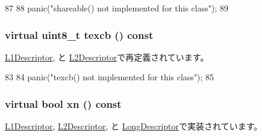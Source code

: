 \begin{DoxyCode}
87         {
88             panic("shareable() not implemented for this class\n");
89         }
\end{DoxyCode}
\hypertarget{classArmISA_1_1TableWalker_1_1DescriptorBase_a7d7e1ce90155279aa511dc49c2b887c2}{
\subsubsection[{texcb}]{\setlength{\rightskip}{0pt plus 5cm}virtual uint8\_\-t texcb () const}}
\label{classArmISA_1_1TableWalker_1_1DescriptorBase_a7d7e1ce90155279aa511dc49c2b887c2}


\hyperlink{classArmISA_1_1TableWalker_1_1L1Descriptor_a2f3e1adbe4ca1fa91c6c12f35828dd73}{L1Descriptor}, と \hyperlink{classArmISA_1_1TableWalker_1_1L2Descriptor_a2f3e1adbe4ca1fa91c6c12f35828dd73}{L2Descriptor}で再定義されています。


\begin{DoxyCode}
83         {
84             panic("texcb() not implemented for this class\n");
85         }
\end{DoxyCode}
\hypertarget{classArmISA_1_1TableWalker_1_1DescriptorBase_a92c5947cbc7259f6e536de82f5b33e4f}{
\subsubsection[{xn}]{\setlength{\rightskip}{0pt plus 5cm}virtual bool xn () const}}
\label{classArmISA_1_1TableWalker_1_1DescriptorBase_a92c5947cbc7259f6e536de82f5b33e4f}


\hyperlink{classArmISA_1_1TableWalker_1_1L1Descriptor_a88a5985b2a6224e7b546fa088b101d66}{L1Descriptor}, \hyperlink{classArmISA_1_1TableWalker_1_1L2Descriptor_a88a5985b2a6224e7b546fa088b101d66}{L2Descriptor}, と \hyperlink{classArmISA_1_1TableWalker_1_1LongDescriptor_a88a5985b2a6224e7b546fa088b101d66}{LongDescriptor}で実装されています。

